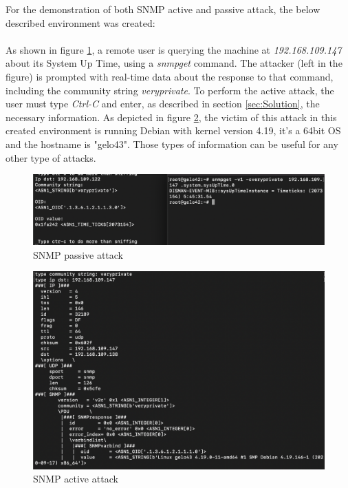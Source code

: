 For the demonstration of both SNMP active and passive attack, the below described environment was created: 
\\\\
As shown in figure \ref{fig:SNMPPassiveAttack}, a remote user is querying the machine at \textit{192.168.109.147} about its System Up Time, using a \textit{snmpget} command. The attacker (left in the figure) is prompted with real-time data about the response to that command, including the community string \textit{veryprivate}. To perform the active attack, the user must type \textit{Ctrl-C} and enter, as described in section \ref{sec:Solution}, the necessary information. As depicted in figure \ref{fig:SNMPActiveAttack}, the victim of this attack in this created environment is running Debian with kernel version 4.19, it's a 64bit OS and the hostname is "gelo43". Those types of information can be useful for any other type of attacks. 

\begin{figure}[h!]
    \centering
    \includegraphics[width=1\linewidth,keepaspectratio]{SNMPSniffing.png}
    \caption{SNMP passive attack}
    \label{fig:SNMPPassiveAttack}
\end{figure}
\FloatBarrier

\begin{figure}[h!]
    \centering
    \includegraphics[width=1\linewidth,keepaspectratio]{SNMPAttack.png}
    \caption{SNMP active attack}
    \label{fig:SNMPActiveAttack}
\end{figure}
\FloatBarrier

